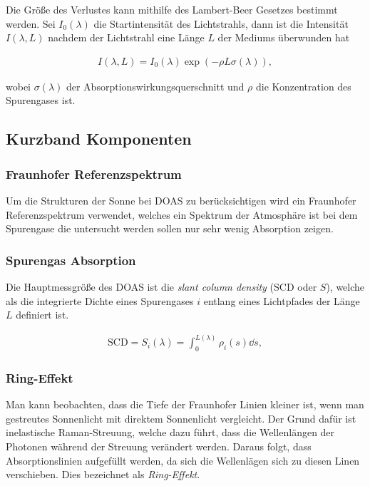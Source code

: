\documentclass[12pt, a4paper, bibliography=totoc]{scrartcl}
\begin{document}
\begin{multicols}{2}
Die Größe des Verlustes kann mithilfe des Lambert-Beer Gesetzes bestimmt werden.
Sei $I_0 (\lambda)$ die Startintensität des Lichtstrahls, dann ist die Intensität $I(\lambda, L)$ nachdem der Lichtstrahl eine Länge $L$ der Mediums überwunden hat
    
\begin{align}
    I(\lambda, L) = I_0 (\lambda) \exp \left( - \rho L \sigma (\lambda)\right) ,\label{eq:lambert_beer_law}
\end{align}

wobei $\sigma (\lambda)$ der Absorptionswirkungsquerschnitt und $\rho$ die Konzentration des Spurengases ist.

\subsection{Kurzband Komponenten}\label{ssec:Kurzband}

\subsubsection{Fraunhofer Referenzspektrum}\label{sssec:fraunhofer_reference}

Um die Strukturen der Sonne bei DOAS zu berücksichtigen wird ein Fraunhofer Referenzspektrum verwendet, welches ein Spektrum der Atmosphäre ist bei dem Spurengase die untersucht werden sollen nur sehr wenig Absorption zeigen.

\subsubsection{Spurengas Absorption}\label{sssec:trace_gas_absorption}

Die Hauptmessgröße des DOAS ist die \textit{slant column density} (SCD oder $S$),
welche als die integrierte Dichte eines Spurengases $i$ entlang eines Lichtpfades der Länge $L$ definiert ist.
    
\begin{align}
    \text{SCD} = S_i (\lambda) = \int_0^{L(\lambda)} \rho_i (s) \dd s ,\label{eq:SCD}
\end{align}

\subsubsection{Ring-Effekt}

Man kann beobachten, dass die Tiefe der Fraunhofer Linien kleiner ist, wenn man gestreutes Sonnenlicht mit direktem Sonnenlicht vergleicht.
Der Grund dafür ist inelastische Raman-Streuung, welche dazu führt, dass die Wellenlängen der Photonen während der Streuung verändert werden.
Daraus folgt, dass Absorptionslinien aufgefüllt werden, da sich die Wellenlägen sich zu diesen Linen verschieben. 
Dies bezeichnet als \textit{Ring-Effekt}.


\end{multicols}
\end{document}
